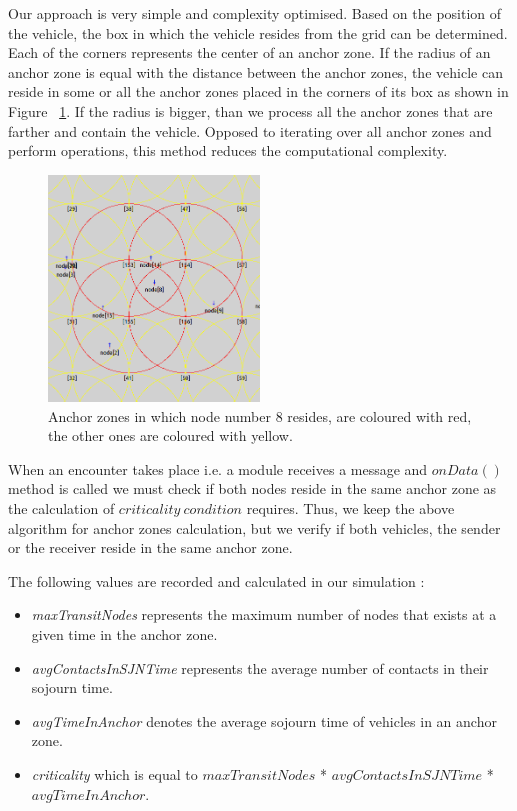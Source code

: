 Our approach is very simple and complexity optimised. Based on the position of
the vehicle, the box in which the vehicle resides from the grid can be
determined. Each of the corners represents the center of an anchor zone. If the
radius of an anchor zone is equal with the distance between the anchor zones,
the vehicle can reside in some or all the anchor zones placed in the corners of
its box as shown in Figure ~\ref{fig:node_az}. If the radius is bigger, than we
process all the anchor zones that are farther and contain the vehicle.
Opposed to iterating over all anchor zones and perform operations, this method
reduces the computational complexity.

\begin{figure}[t]
	\centering
	\includegraphics[width=0.5\textwidth]{img/node_az}
	\caption{Anchor zones in which node number 8 resides, are coloured with red,
	the other ones are coloured with yellow.}
	\label{fig:node_az}
\end{figure}

When an encounter takes place i.e. a module receives a message and $onData()$
method is called we must check if both nodes reside in the same anchor zone as
the calculation of $criticality\ condition$ requires. Thus, we keep the above
algorithm for anchor zones calculation, but we verify if both vehicles, the
sender or the receiver reside in the same anchor zone.

The following values are recorded and calculated in our simulation :
\begin{itemize}
	\item {\it maxTransitNodes} represents the maximum number of nodes that exists
	at a given time in the anchor zone.
	\item {\it avgContactsInSJNTime} represents the average number of contacts in
	their sojourn time.
	\item {\it avgTimeInAnchor} denotes the average sojourn time of vehicles in an
	anchor zone.
	\item {\it criticality} which is equal to $maxTransitNodes$ *
	$avgContactsInSJNTime$ * $avgTimeInAnchor$.
\end{itemize}


